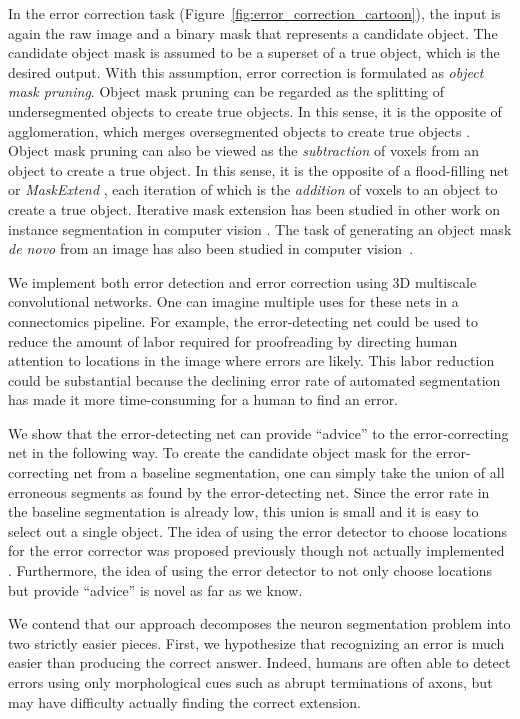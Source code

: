 \documentclass{article}
\begin{document}
In the error correction task (Figure~\ref{fig:error_correction_cartoon}), the input is again the raw image and a binary mask that represents a candidate object. The candidate object mask is assumed to be a superset of a true object, which is the desired output. With this assumption, error correction is formulated as \emph{object mask pruning}.
Object mask pruning can be regarded as the splitting of undersegmented objects to create true objects. In this sense, it is the opposite of agglomeration, which merges oversegmented objects to create true objects \cite{lash,gala}. Object mask pruning can also be viewed as the \emph{subtraction} of voxels from an object to create a true object. In this sense, it is the opposite of a flood-filling net \cite{floodfilling,januszewski2017high} or \emph{MaskExtend} \cite{multipass}, each iteration of which is the \emph{addition} of voxels to an object to create a true object. Iterative mask extension has been studied in other work on instance segmentation in computer vision \cite{recurrent_instance_seg_1, recurrent_instance_seg_2}.  The task of generating an object mask \emph{de novo} from an image has also been studied in computer vision~\cite{pinheiro2015}.

We implement both error detection and error correction using 3D multiscale convolutional networks.  One can imagine multiple uses for these nets in a connectomics pipeline. For example, the error-detecting net could be used to reduce the amount of labor required for proofreading by directing human attention to locations in the image where errors are likely. This labor reduction could be substantial because the declining error rate of automated segmentation has made it more time-consuming for a human to find an error.

We show that the error-detecting net can provide ``advice'' to the  error-correcting net in the following way. To create the candidate object mask for the error-correcting net from a baseline segmentation, one can simply take the union of all erroneous segments as found by the error-detecting net. Since the error rate in the baseline segmentation is already low, this union is small and it is easy to select out a single object. The idea of using the error detector to choose locations for the error corrector was proposed previously though not actually implemented \cite{multipass}. Furthermore, the idea of using the error detector to not only choose locations but provide ``advice'' is novel as far as we know.

We contend that our approach decomposes the neuron segmentation problem into two strictly easier pieces. First, we hypothesize that recognizing an error is much easier than producing the correct answer. Indeed, humans are often able to detect errors using only morphological cues such as abrupt terminations of axons, but may have difficulty actually finding the correct extension.
\end{document}
